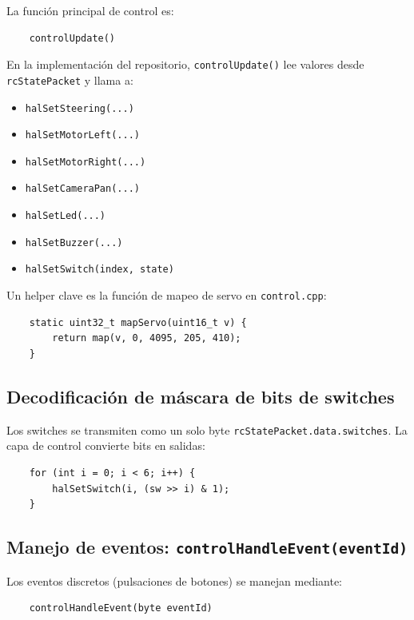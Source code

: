 La función principal de control es:

\begin{verbatim}
    controlUpdate()
\end{verbatim}

En la implementación del repositorio, \texttt{controlUpdate()} lee valores desde \texttt{rcStatePacket} y llama a:

\begin{itemize}
    \item \texttt{halSetSteering(...)}
    \item \texttt{halSetMotorLeft(...)}
    \item \texttt{halSetMotorRight(...)}
    \item \texttt{halSetCameraPan(...)}
    \item \texttt{halSetLed(...)}
    \item \texttt{halSetBuzzer(...)}
    \item \texttt{halSetSwitch(index, state)}
\end{itemize}

Un helper clave es la función de mapeo de servo en \texttt{control.cpp}:

\begin{verbatim}
    static uint32_t mapServo(uint16_t v) {
        return map(v, 0, 4095, 205, 410);
    }
\end{verbatim}

\subsection{Decodificación de máscara de bits de switches}
\label{subsec:control-hal-switch-mask}

Los switches se transmiten como un solo byte \texttt{rcStatePacket.data.switches}.
La capa de control convierte bits en salidas:

\begin{verbatim}
    for (int i = 0; i < 6; i++) {
        halSetSwitch(i, (sw >> i) & 1);
    }
\end{verbatim}

\subsection{Manejo de eventos: \texttt{controlHandleEvent(eventId)}}
\label{subsec:control-hal-events}

Los eventos discretos (pulsaciones de botones) se manejan mediante:

\begin{verbatim}
    controlHandleEvent(byte eventId)
\end{verbatim}

